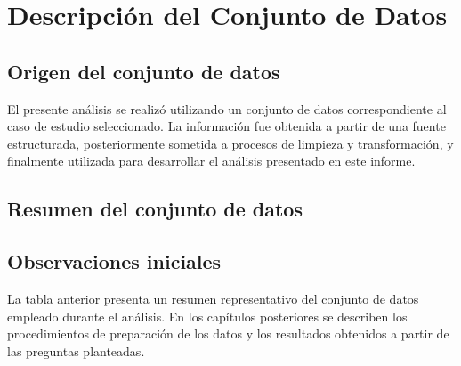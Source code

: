 \chapter{Descripción del Conjunto de Datos}


\section{Origen del conjunto de datos}

El presente análisis se realizó utilizando un conjunto de datos correspondiente al caso de estudio seleccionado. La información fue obtenida a partir de una fuente estructurada, posteriormente sometida a procesos de limpieza y transformación, y finalmente utilizada para desarrollar el análisis presentado en este informe.


\section{Resumen del conjunto de datos}




\section{Observaciones iniciales}

La tabla anterior presenta un resumen representativo del conjunto de datos empleado durante el análisis. En los capítulos posteriores se describen los procedimientos de preparación de los datos y los resultados obtenidos a partir de las preguntas planteadas.